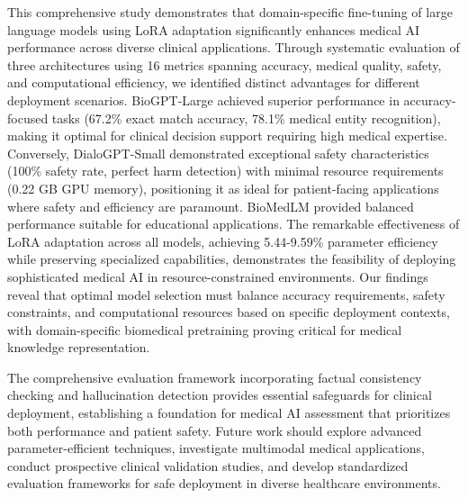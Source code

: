 \documentclass[conference]{IEEEtran}
\begin{document}
This comprehensive study demonstrates that domain-specific fine-tuning of large language models using LoRA adaptation significantly enhances medical AI performance across diverse clinical applications. Through systematic evaluation of three architectures using 16 metrics spanning accuracy, medical quality, safety, and computational efficiency, we identified distinct advantages for different deployment scenarios. BioGPT-Large achieved superior performance in accuracy-focused tasks (67.2\% exact match accuracy, 78.1\% medical entity recognition), making it optimal for clinical decision support requiring high medical expertise. Conversely, DialoGPT-Small demonstrated exceptional safety characteristics (100\% safety rate, perfect harm detection) with minimal resource requirements (0.22 GB GPU memory), positioning it as ideal for patient-facing applications where safety and efficiency are paramount. BioMedLM provided balanced performance suitable for educational applications. The remarkable effectiveness of LoRA adaptation across all models, achieving 5.44-9.59\% parameter efficiency while preserving specialized capabilities, demonstrates the feasibility of deploying sophisticated medical AI in resource-constrained environments. Our findings reveal that optimal model selection must balance accuracy requirements, safety constraints, and computational resources based on specific deployment contexts, with domain-specific biomedical pretraining proving critical for medical knowledge representation.

The comprehensive evaluation framework incorporating factual consistency checking and hallucination detection provides essential safeguards for clinical deployment, establishing a foundation for medical AI assessment that prioritizes both performance and patient safety. Future work should explore advanced parameter-efficient techniques, investigate multimodal medical applications, conduct prospective clinical validation studies, and develop standardized evaluation frameworks for safe deployment in diverse healthcare environments.
\end{document}
